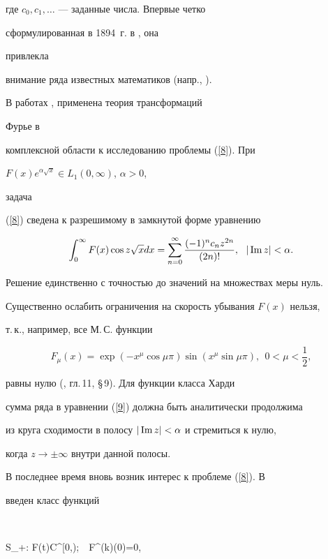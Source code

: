 где $c_0, c_1,\dotsc$ --- заданные числа. Впервые четко


сформулированная в 1894~г. в \cite{Stiltjes}, она 


привлекла


внимание ряда известных математиков (напр., \cite{ShoTam}).


В работах \cite{Hardy1}, \cite{Hardy2} применена теория трансформаций 


Фурье в


комплексной области к исследованию проблемы (\ref{8}). При 


$F(x)e^{\alpha\sqrt x}\in L_1(0,\infty)$, $\alpha>0$,


 задача


(\ref{8}) сведена к разрешимому в замкнутой форме уравнению


\begin{equation}\label{9}


\int_0^\infty F(x)\cos z\sqrt{x}dx=\sum_{n=0}^\infty


\frac{(-1)^n c_n z^{2n}}{(2n)!},\ \ |\im z|<\alpha.


\end{equation}


Решение единственно с точностью до значений на множествах меры нуль.


Существенно ослабить ограничения на скорость убывания $F(x)$ нельзя,


т.\,к., например, все М.\,С. функции


$$ 


F_\mu(x)=\exp(-


x^\mu\cos\mu\pi)\sin(x^\mu\sin\mu\pi),\ \ 0<\mu<\frac 12,


$$


равны нулю (\cite{Tit48}, гл.\,11, \S\,9). Для функции класса Харди


сумма ряда в уравнении (\ref{9}) должна быть аналитически продолжима


из круга сходимости в полосу $|\operatorname{Im} z|<\alpha$ и стремиться к нулю,


когда $z\to\pm\infty$ внутри данной полосы. 





В последнее время вновь возник интерес к проблеме (\ref{8}). В


\cite{Duran} введен класс функций


$$


S_+: F(t)\in C^\infty[0,\infty);\ \ F^{(k)}(0)=0,


